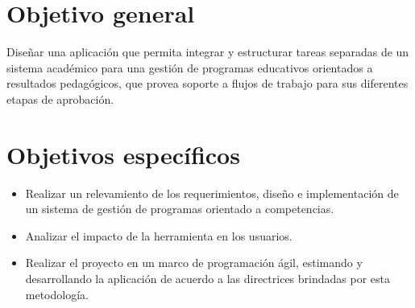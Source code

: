 \section{Objetivo general}
Diseñar una aplicación que permita integrar y estructurar tareas separadas de un sistema académico para una gestión de programas educativos orientados a resultados pedagógicos, que provea soporte a flujos de trabajo para sus diferentes etapas de aprobación.


\section{Objetivos específicos}
  \begin{itemize}
    \item Realizar un relevamiento de los requerimientos, diseño e implementación de un sistema de gestión de programas orientado a competencias.
    \item Analizar el impacto de la herramienta en los usuarios.
    \item Realizar el proyecto en un marco de programación ágil, estimando y desarrollando la aplicación de acuerdo a las directrices brindadas por esta metodología\citep{stober_overview_2010}.
  \end{itemize}